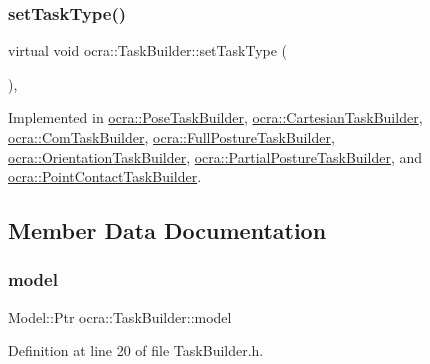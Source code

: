 \subsubsection{\texorpdfstring{set\+Task\+Type()}{setTaskType()}}
{\footnotesize\ttfamily virtual void ocra\+::\+Task\+Builder\+::set\+Task\+Type (\begin{DoxyParamCaption}{ }\end{DoxyParamCaption})\hspace{0.3cm}{\ttfamily [protected]}, {}}



Implemented in \hyperlink{classocra_1_1PoseTaskBuilder_aafc5b611352f7cbebecaa51cf534c68c}{ocra\+::\+Pose\+Task\+Builder}, \hyperlink{classocra_1_1CartesianTaskBuilder_a679842b95d6f7296a466636fd21bbbb8}{ocra\+::\+Cartesian\+Task\+Builder}, \hyperlink{classocra_1_1ComTaskBuilder_af9cfac995156297324ccbee1900f891c}{ocra\+::\+Com\+Task\+Builder}, \hyperlink{classocra_1_1FullPostureTaskBuilder_a5bae08175fd730b46004ddfccc9a1d8b}{ocra\+::\+Full\+Posture\+Task\+Builder}, \hyperlink{classocra_1_1OrientationTaskBuilder_a491f3d3db66afb5b5e3230983b4b15c9}{ocra\+::\+Orientation\+Task\+Builder}, \hyperlink{classocra_1_1PartialPostureTaskBuilder_acf2b5f880dc19e43356552b348d8a010}{ocra\+::\+Partial\+Posture\+Task\+Builder}, and \hyperlink{classocra_1_1PointContactTaskBuilder_a88d7c619f00708c1b3472ee7dc373f96}{ocra\+::\+Point\+Contact\+Task\+Builder}.



\subsection{Member Data Documentation}
\hypertarget{classocra_1_1TaskBuilder_af612ab3b2881a7d472efabb650b23caf}{}\label{classocra_1_1TaskBuilder_af612ab3b2881a7d472efabb650b23caf} 
\subsubsection{\texorpdfstring{model}{model}}
{\footnotesize\ttfamily Model\+::\+Ptr ocra\+::\+Task\+Builder\+::model\hspace{0.3cm}{\ttfamily [protected]}}



Definition at line 20 of file Task\+Builder.\+h.

\hypertarget{classocra_1_1TaskBuilder_a93ad03ab72579612f7ec5fe57b5df145}{}\label{classocra_1_1TaskBuilder_a93ad03ab72579612f7ec5fe57b5df145} 

